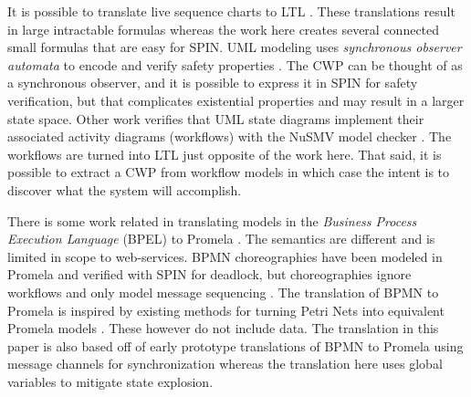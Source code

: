 It is possible to translate live sequence charts to LTL \cite{KUMAR, KUMAR2009137}. These translations result in large intractable formulas whereas the work here creates several connected small formulas that are easy for SPIN. UML modeling uses \emph{synchronous observer automata} to encode and verify safety properties \cite{8906967}. The CWP can be thought of as a synchronous observer, and it is possible to express it in SPIN for safety verification, but that complicates existential properties and may result in a larger state space. Other work verifies that UML state diagrams implement their associated activity diagrams (workflows) with the NuSMV model checker \cite{7436156}. The workflows are turned into LTL just opposite of the work here. That said, it is possible to extract a CWP from workflow models in which case the intent is to discover what the system will accomplish.

There is some work related in translating models in the \emph{Business Process Execution Language} (BPEL) to Promela \cite{bpelToPromela}. The semantics are different and is limited in scope to web-services. BPMN choreographies have been modeled in Promela and verified with SPIN for deadlock, but choreographies ignore workflows and only model message sequencing \cite{choreography}. The translation of BPMN to Promela is inspired by existing methods for turning Petri Nets into equivalent Promela models \cite{petrinetToPromela, petrinetInspiration}. These however do not include data. The translation in this paper is also based off of early prototype translations of BPMN to Promela using message channels for synchronization \cite{bpmn2promela} whereas the translation here uses global variables to mitigate state explosion.